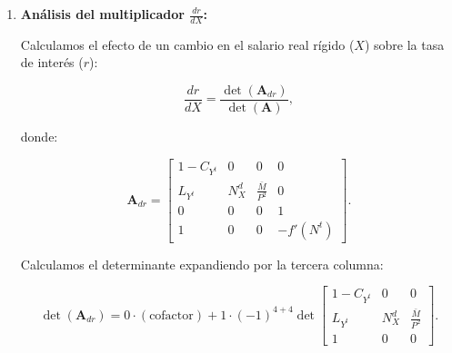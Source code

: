 \documentclass[
  doc,
  floatsintext,
  longtable,
  a4paper,
  nolmodern,
  notxfonts,
  notimes,
  12pt,
  colorlinks=true,linkcolor=blue,citecolor=blue,urlcolor=blue]{apa7}
\begin{document}
\begin{enumerate}
  Calculamos el determinante expandiendo por la tercera columna:

  \[
  \det(\mathbf{A}_{dN^t}) = N^d_X \cdot (-1)^{3+4} \det \begin{bmatrix}
  1 - C_{Y^t} & -I_r & 0 \\
  L_{Y^t} & L_r & \frac{\bar{M}}{P^2} \\
  1 & 0 & 0
  \end{bmatrix}.
  \]

  Usamos el determinante ya calculado:

  \[
  \det(\mathbf{A}_{dN^t}) = -N^d_X \cdot \left( -I_r \frac{\bar{M}}{P^2} \right) = N^d_X I_r \frac{\bar{M}}{P^2}.
  \]

  Entonces:

  \[
  \frac{dN^t}{dX} = \frac{N^d_X I_r \frac{\bar{M}}{P^2}}{-I_r \frac{\bar{M}}{P^2}} = -N^d_X.
  \]

  Dado que \(N^d_X < 0\) (la demanda de trabajo disminuye con un mayor
  salario real), entonces:

  \[
  \frac{dN^t}{dX} < 0.
  \]

  Esto es consistente con el modelo clásico con rigidez de salario real:
  un aumento en \(X\) reduce el empleo \(N^t\).
\item
  \textbf{Análisis del multiplicador \(\frac{dr}{dX}\):}

  Calculamos el efecto de un cambio en el salario real rígido (\(X\))
  sobre la tasa de interés (\(r\)):

  \[
  \frac{dr}{dX} = \frac{\det(\mathbf{A}_{dr})}{\det(\mathbf{A})},
  \]

  donde:

  \[
  \mathbf{A}_{dr} = \begin{bmatrix}
  1 - C_{Y^t} & 0 & 0 & 0 \\
  L_{Y^t} & N^d_X & \frac{\bar{M}}{P^2} & 0 \\
  0 & 0 & 0 & 1 \\
  1 & 0 & 0 & -f'(N^t)
  \end{bmatrix}.
  \]

  Calculamos el determinante expandiendo por la tercera columna:

  \[
  \det(\mathbf{A}_{dr}) = 0 \cdot (\text{cofactor}) + 1 \cdot (-1)^{4+4} \det \begin{bmatrix}
  1 - C_{Y^t} & 0 & 0 \\
  L_{Y^t} & N^d_X & \frac{\bar{M}}{P^2} \\
  1 & 0 & 0
  \end{bmatrix}.
  \]


\end{enumerate}
\end{document}
